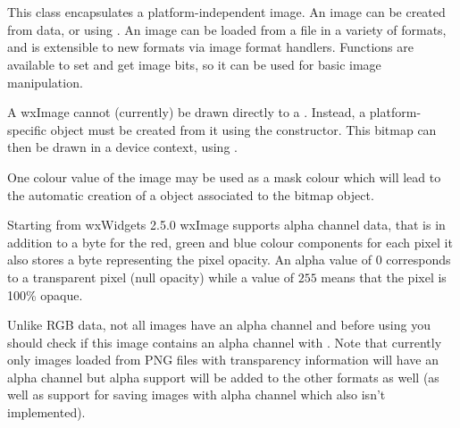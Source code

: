 
\section{}\label{wximage}

This class encapsulates a platform-independent image. An image can be created
from data, or using . An image
can be loaded from a file in a variety of formats, and is extensible to new formats
via image format handlers. Functions are available to set and get image bits, so
it can be used for basic image manipulation.

A wxImage cannot (currently) be drawn directly to a . Instead,
a platform-specific  object must be created from it using
the  constructor.
This bitmap can then
be drawn in a device context, using .

One colour value of the image may be used as a mask colour which will lead to the automatic
creation of a  object associated to the bitmap object.


Starting from wxWidgets 2.5.0 wxImage supports alpha channel data, that is in
addition to a byte for the red, green and blue colour components for each pixel
it also stores a byte representing the pixel opacity. An alpha value of $0$
corresponds to a transparent pixel (null opacity) while a value of $255$
means that the pixel is 100\% opaque.

Unlike RGB data, not all images have an alpha channel and before using
 you should check if this image contains
an alpha channel with . Note that currently only
images loaded from PNG files with transparency information will have an alpha
channel but alpha support will be added to the other formats as well (as well
as support for saving images with alpha channel which also isn't implemented).

